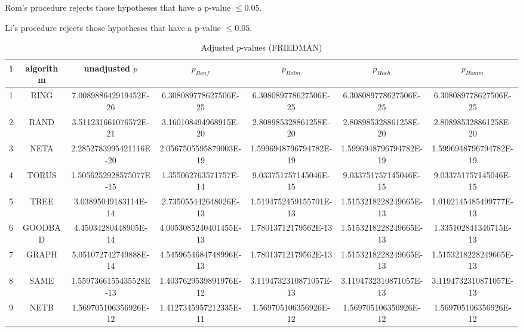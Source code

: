 \documentclass[a4paper,10pt]{article}
\begin{document}
\begin{landscape}
Rom's procedure rejects those hypotheses that have a p-value $\le0.05$.


Li's procedure rejects those hypotheses that have a p-value $\le0.05$.



\newpage

\begin{table}[!htp]
\centering\scriptsize
\caption{Adjusted $p$-values (FRIEDMAN)}
\begin{tabular}{ccccccc}
i&algorithm&unadjusted $p$&$p_{Bonf}$&$p_{Holm}$&$p_{Hoch}$&$p_{Homm}$\\
\hline
1& RING&7.008988642919452E-26&6.308089778627506E-25&6.308089778627506E-25&6.308089778627506E-25&6.308089778627506E-25\\
2& RAND&3.511231661076572E-21&3.160108494968915E-20&2.808985328861258E-20&2.808985328861258E-20&2.808985328861258E-20\\
3& NETA&2.2852783995421116E-20&2.0567505595879003E-19&1.5996948796794782E-19&1.5996948796794782E-19&1.5996948796794782E-19\\
4& TORUS&1.5056252928575077E-15&1.355062763571757E-14&9.033751757145046E-15&9.033751757145046E-15&9.033751757145046E-15\\
5& TREE&3.03895049183114E-14&2.735055442648026E-13&1.5194752459155701E-13&1.5153218228249665E-13&1.0102145485499777E-13\\
6& GOODBAD&4.45034280448905E-14&4.0053085240401455E-13&1.78013712179562E-13&1.5153218228249665E-13&1.335102841346715E-13\\
7& GRAPH&5.051072742749888E-14&4.5459654684748996E-13&1.78013712179562E-13&1.5153218228249665E-13&1.5153218228249665E-13\\
8& SAME&1.5597366155435528E-13&1.4037629539891976E-12&3.1194732310871057E-13&3.1194732310871057E-13&3.1194732310871057E-13\\
9& NETB&1.569705106356926E-12&1.4127345957212335E-11&1.569705106356926E-12&1.569705106356926E-12&1.569705106356926E-12\\
\hline
\end{tabular}
\end{table}


\end{landscape}
\end{document}
